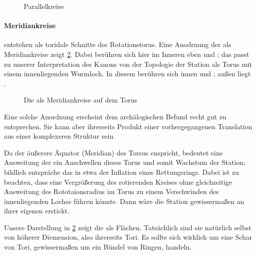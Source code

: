 \begin{figure}[ht!]
    \centering
    
    \caption{Parallelkreise}
    \label{fig:torus-parallele}
\end{figure}

\paragraph{Meridiankreise} entstehen als toridale Schnitte des Rotationstorus. 
Eine Anodrnung der  als Meridiankreise  zeigt \cref{fig:torus-meridiane}.  
Dabei berühren sich hier im Inneren eben  und ; das passt zu unserer Interpretation des Kanons von der Topologie der Station als Torus mit einem innenliegenden Wurmloch. In diesem berühren sich innen  und ; außen liegt . 

\begin{figure}[ht!]
    \centering
        
    \caption{Die  als Meridiankreise auf dem Torus}
    \label{fig:torus-meridiane}
\end{figure}

Eine solche Anordnung erscheint dem archälogischen Befund recht gut zu entsprechen. Sie kann aber ihrerseits Produkt einer vorhergegangenen Translation aus einer komplexeren Struktur sein.

Da der äußerere Äquator (Meridian) des Torsus  enspricht, bedeutet eine Ausweitung der  ein Anschwellen dieses Torus und somit Wachstum der Station; bildlich entspräche das in etwa der Inflation eines Rettungsrings. Dabei ist zu beachten, dass eine Vergrößerung des rotierenden Kreises ohne gleichzeitige Ausweitung des Rototaionsradius im Torus zu einem Verschwinden des innenliegenden Loches führen könnte. Dann wäre die Station gewissermaßen an ihrer eigenen  erstickt.

Unsere Darstellung in \cref{fig:torus-meridiane} zeigt die  als Flächen. Tatsächlich sind sie natürlich selbst von höherer Diemension, also ihrerseits Tori. Es sollte sich wirklich um eine Schar von Tori, gewissermaßen um ein Bündel von Ringen, handeln.

